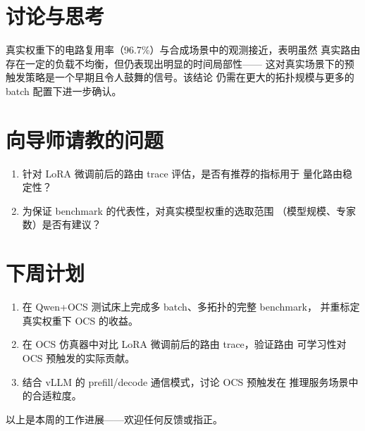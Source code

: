 \documentclass[11pt]{article}
\begin{document}
\section{讨论与思考}

真实权重下的电路复用率（96.7\%）与合成场景中的观测接近，表明虽然
真实路由存在一定的负载不均衡，但仍表现出明显的时间局部性——
这对真实场景下的预触发策略是一个早期且令人鼓舞的信号。该结论
仍需在更大的拓扑规模与更多的 batch 配置下进一步确认。

\section{向导师请教的问题}

\begin{enumerate}
  \item 针对 LoRA 微调前后的路由 trace 评估，是否有推荐的指标用于
        量化路由稳定性？
  \item 为保证 benchmark 的代表性，对真实模型权重的选取范围
        （模型规模、专家数）是否有建议？
\end{enumerate}

\section{下周计划}

\begin{enumerate}
  \item 在 Qwen+OCS 测试床上完成多 batch、多拓扑的完整 benchmark，
        并重标定真实权重下 OCS 的收益。
  \item 在 OCS 仿真器中对比 LoRA 微调前后的路由 trace，验证路由
        可学习性对 OCS 预触发的实际贡献。
  \item 结合 vLLM 的 prefill/decode 通信模式，讨论 OCS 预触发在
        推理服务场景中的合适粒度。
\end{enumerate}

\vspace{1em}
\noindent 以上是本周的工作进展——欢迎任何反馈或指正。

% 
% 
\end{document}
